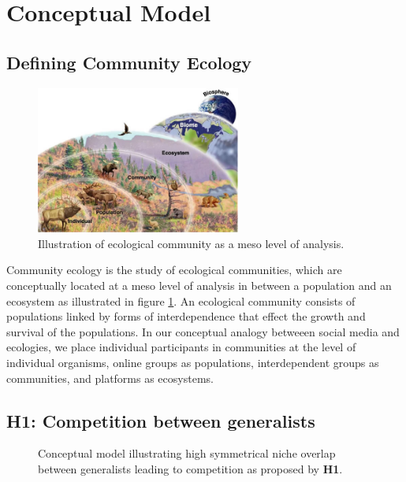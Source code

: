 \documentclass[12pt]{memoir}
\begin{document}
\section{Conceptual Model}

\label{sec:conc-modeld}

\subsection{Defining Community Ecology}

\begin{figure}[h]
\centering
  \includegraphics[width=0.6\textwidth]{resources/ecological_community.jpg}
  \caption{Illustration of ecological community as a meso level of analysis.\label{fig:ecocom}}
\end{figure}
Community ecology is the study of ecological communities, which are conceptually located at a meso level of analysis in between a population and an ecosystem as illustrated in figure \ref{fig:ecocom}.  An ecological community consists of populations linked by forms of interdependence that effect the growth and survival of the populations.  In our conceptual analogy betweeen social media and ecologies, we place individual participants in communities at the level of individual organisms, online groups as populations, interdependent groups as communities, and platforms as ecosystems. 

\subsection{\textbf{H1:} Competition between generalists}

\begin{figure}[b]
\centering

\caption{Conceptual model illustrating high symmetrical niche overlap between generalists leading to competition as proposed by \textbf{H1}. \label{fig:H1_chart}}
\end{figure}
\end{document}
